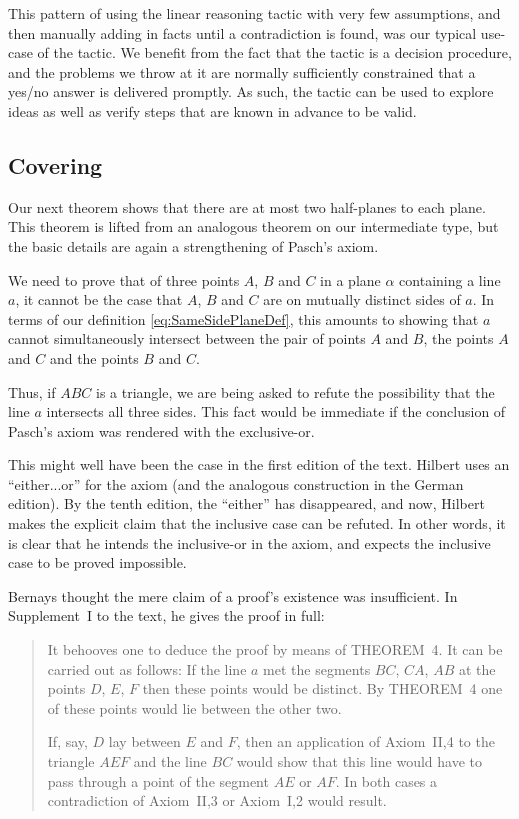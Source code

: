 This pattern of using the linear reasoning tactic with very few assumptions, and then manually adding in facts until a contradiction is found, was our typical use-case of the tactic. We benefit from the fact that the tactic is a decision procedure, and the problems we throw at it are normally sufficiently constrained that a yes/no answer is delivered promptly. As such, the tactic can be used to explore ideas as well as verify steps that are known in advance to be valid.

\subsection{Covering}
Our next theorem shows that there are at most two half-planes to each plane. This theorem is lifted from an analogous theorem on our intermediate type, but the basic details are again a strengthening of Pasch's axiom.

We need to prove that of three points $A$, $B$ and $C$ in a plane $\alpha$ containing a line $a$, it cannot be the case that $A$, $B$ and $C$ are on mutually distinct sides of $a$. In terms of our definition \eqref{eq:SameSidePlaneDef}, this amounts to showing that $a$ cannot simultaneously intersect between the pair of points $A$ and $B$, the points $A$ and $C$ and the points $B$ and $C$. 

\label{sec:PaschInclusiveOr}Thus, if $ABC$ is a triangle, we are being asked to refute the possibility that the line $a$ intersects all three sides. This fact would be immediate if the conclusion of Pasch's axiom was rendered with the exclusive-or. 

This might well have been the case in the first edition of the text. Hilbert uses an ``either...or'' for the axiom (and the analogous construction in the German edition). By the tenth edition, the ``either'' has disappeared, and now, Hilbert makes the explicit claim that the inclusive case can be refuted. In other words, it is clear that he intends the inclusive-or in the axiom, and expects the inclusive case to be proved impossible.

Bernays thought the mere claim of a proof's existence was insufficient. In Supplement~I to the text, he gives the proof in full:

\begin{quotation}\label{sec:SupplementI}
It behooves one to deduce the proof by means of THEOREM~4. It can be carried out as follows: If the line $a$ met the segments $BC$, $CA$, $AB$ at the points $D$, $E$, $F$ then these points would be distinct. By THEOREM~4 one of these points would lie between the other two.

If, say, $D$ lay between $E$ and $F$, then an application of Axiom~II,4 to the triangle $AEF$ and the line $BC$ would show that this line would have to pass through a point of the segment $AE$ or $AF$. In both cases a contradiction of Axiom~II,3 or Axiom~I,2 would result.
\end{quotation}

